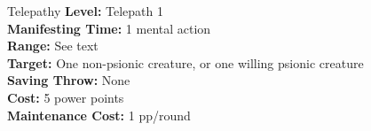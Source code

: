 {Telepathy}
{
	\textbf{Level:}
	Telepath 1\\
	\textbf{Manifesting Time:}
	1 mental action\\
	\textbf{Range:}
	See text\\
	\textbf{Target:}
	One non-psionic creature, or one willing psionic creature\\
	\textbf{Saving Throw:}
	None\\
	\textbf{Cost:}
	5 power points\\
	\textbf{Maintenance Cost:}
	1 pp/round\\
}
